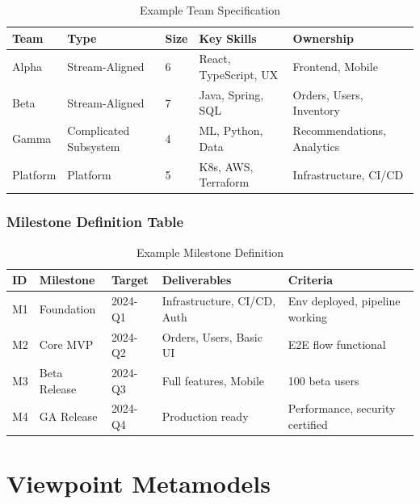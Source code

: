 \documentclass[11pt,letterpaper]{article}
\begin{document}
\begin{table}[H]
\centering
\caption{Example Team Specification}
\small
\begin{tabular}{@{}L{2cm}L{2cm}C{1.2cm}L{3.5cm}L{3cm}@{}}
\toprule
\textbf{Team} & \textbf{Type} & \textbf{Size} & \textbf{Key Skills} & \textbf{Ownership} \\
\midrule
Alpha & Stream-Aligned & 6 & React, TypeScript, UX & Frontend, Mobile \\
\addlinespace
Beta & Stream-Aligned & 7 & Java, Spring, SQL & Orders, Users, Inventory \\
\addlinespace
Gamma & Complicated Subsystem & 4 & ML, Python, Data & Recommendations, Analytics \\
\addlinespace
Platform & Platform & 5 & K8s, AWS, Terraform & Infrastructure, CI/CD \\
\bottomrule
\end{tabular}
\end{table}

\subsubsection{Milestone Definition Table}

\begin{table}[H]
\centering
\caption{Example Milestone Definition}
\small
\begin{tabular}{@{}L{1.5cm}L{2.5cm}L{2cm}L{4cm}L{2.5cm}@{}}
\toprule
\textbf{ID} & \textbf{Milestone} & \textbf{Target} & \textbf{Deliverables} & \textbf{Criteria} \\
\midrule
M1 & Foundation & 2024-Q1 & Infrastructure, CI/CD, Auth & Env deployed, pipeline working \\
\addlinespace
M2 & Core MVP & 2024-Q2 & Orders, Users, Basic UI & E2E flow functional \\
\addlinespace
M3 & Beta Release & 2024-Q3 & Full features, Mobile & 100 beta users \\
\addlinespace
M4 & GA Release & 2024-Q4 & Production ready & Performance, security certified \\
\bottomrule
\end{tabular}
\end{table}

\section{Viewpoint Metamodels}
\end{document}
